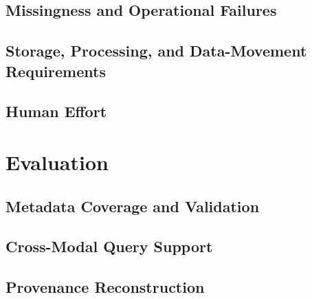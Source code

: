 \documentclass[manuscript]{acmart}
\begin{document}

\subsection{Missingness and Operational Failures}

\subsection{Storage, Processing, and Data-Movement Requirements}

\subsection{Human Effort}

\newpage
\section{Evaluation}
\label{sec:evaluation}


\subsection{Metadata Coverage and Validation}


\subsection{Cross-Modal Query Support}

%

\subsection{Provenance Reconstruction}
\end{document}

